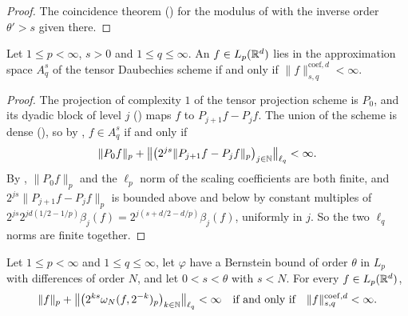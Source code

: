 \begin{proof}
\leanok
{}
The coincidence theorem () for the modulus of
 with the inverse order $\theta' > s$ given there.
\end{proof}

\begin{theorem}
\label{thm:daub-rd-approx-coeff}
\leanok
{}
Let $1 \leq p < \infty$, $s > 0$ and $1 \leq q \leq \infty$. An $f \in L_p(\mathbb{R}^d)$ lies in the
approximation space $A^s_q$ of the tensor Daubechies scheme if and only if
$\|f\|^{\mathrm{coef},d}_{s,q} < \infty$.
\end{theorem}

\begin{proof}
\leanok
{}
The projection of complexity $1$ of the tensor projection scheme is $P_0$, and its dyadic block
of level $j$ () maps $f$ to $P_{j+1} f - P_j f$. The union of the scheme is
dense (), so by , $f \in A^s_q$ if and only if
\[
  \|P_0 f\|_p + \bigl\|\bigl(2^{js} \|P_{j+1} f - P_j f\|_p\bigr)_{j \in \mathbb{N}}\bigr\|_{\ell_q}
  < \infty .
\]
By , $\|P_0 f\|_p$ and the $\ell_p$ norm of the scaling
coefficients are both finite, and $2^{js} \|P_{j+1} f - P_j f\|_p$ is bounded above and below by
constant multiples of $2^{js} 2^{jd(1/2 - 1/p)} \beta_j(f) = 2^{j(s + d/2 - d/p)} \beta_j(f)$,
uniformly in $j$. So the two $\ell_q$ norms are finite together.
\end{proof}

\begin{theorem}
\label{thm:daub-rd-besov}
\leanok
{}
Let $1 \leq p < \infty$ and $1 \leq q \leq \infty$, let $\varphi$ have a Bernstein bound of order
$\theta$ in $L_p$ with differences of order $N$, and let $0 < s < \theta$ with $s < N$. For every
$f \in L_p(\mathbb{R}^d)$,
\[
  \|f\|_p + \bigl\|\bigl(2^{ks} \omega_N(f, 2^{-k})_p\bigr)_{k \in \mathbb{N}}\bigr\|_{\ell_q} < \infty
  \quad\text{if and only if}\quad \|f\|^{\mathrm{coef},d}_{s,q} < \infty .
\]
\end{theorem}


